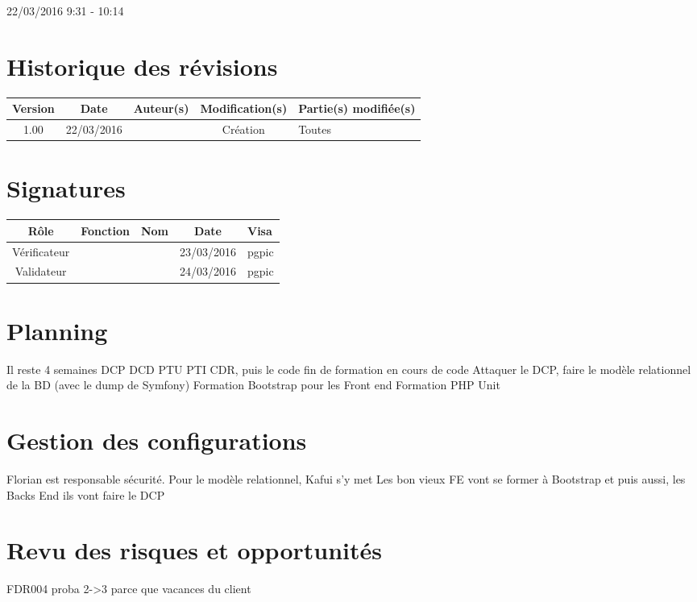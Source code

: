 \documentclass [a4paper] {article}
\begin{document}
22/03/2016			 				%
\hfill   
\hfill 	 9:31 - 10:14 				%



\section*{Historique des révisions}
\begin{center}
			\begin{tabular}{| c | c | c | c | p{4cm} |}
				\hline
				\rowcolor{Gray}
				Version & Date & Auteur(s) & Modification(s) & Partie(s) modifiée(s)		 \\
				\hline
				1.00 & 22/03/2016 & \Pierre & Création & Toutes \\
		\hline		
			\end{tabular}
		\end{center}

\section*{Signatures}

		\begin{center}
			\begin{tabular}{| c | c | c | c | p{4cm} |}
				\hline
				\rowcolor{Gray}
				Rôle & Fonction & Nom & Date & Visa		 \\
				\hline
				Vérificateur & \RQA & \Kafui & 23/03/2016 & pgpic \\[30pt]
				\hline
				Validateur & \CP & \Sergi & 24/03/2016 & pgpic \\[30pt]	
				\hline
			\end{tabular}
		\end{center}
		
\newpage		



\section{Planning}
Il reste 4 semaines DCP DCD PTU PTI CDR, puis le code
fin de formation en cours de code
Attaquer le DCP, faire le modèle relationnel de la BD (avec le dump de Symfony)
Formation Bootstrap pour les Front end
Formation PHP Unit


\section{Gestion des configurations}
Florian est responsable sécurité.
Pour le modèle relationnel, Kafui s'y met
Les bon vieux FE vont se former à Bootstrap et puis aussi, les Backs End ils vont faire le DCP


\section{Revu des risques et opportunités}

FDR004 proba 2->3 parce que vacances du client 





\end{document}
